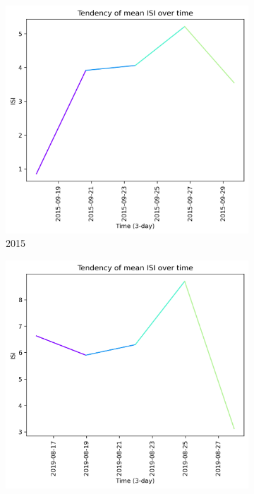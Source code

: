 \begin{figure}[h]
    \centering
    \caption{ISI values 15 days prior to wildfire}
    \begin{subfigure}{0.3\textwidth}
        \centering
        \includegraphics[width=\textwidth]{graphs/2015/15daysprior/2015_15daysprior_tendency_graph_ISI.png}
        \caption{2015}
        \label{fig:isi_prior_15_days_2015}
    \end{subfigure}
    \hfill
    \begin{subfigure}{0.3\textwidth}
        \centering
        \includegraphics[width=\textwidth]{graphs/2019/15daysprior/2019_15daysprior_tendency_graph_ISI.png}

\end{subfigure}
\end{figure}

